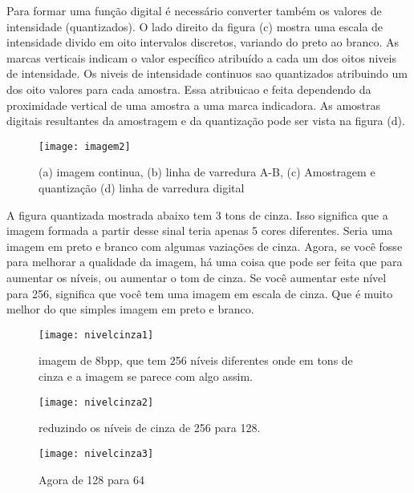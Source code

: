 \documentclass[a4paper,11pt]{article}
\begin{document}
\begin{multicols}{2}
Para formar uma função digital é necessário converter também os valores de intensidade (quantizados). O lado direito da figura (c) mostra uma escala de intensidade divido em oito intervalos discretos, variando do preto ao branco. As marcas verticais indicam o valor
específico atribuído a cada um dos oitos niveis de intensidade. Os niveis de intensidade
 continuos sao quantizados atribuindo um dos oito valores para cada amostra. Essa
 atribuicao e feita dependendo da proximidade vertical de uma amostra a uma marca
 indicadora. As amostras digitais resultantes da amostragem e da quantização pode ser
 vista na figura (d).

\begin{figure}[H]
	\centering 
	\texttt{[image: imagem2]}
	\caption{(a) imagem continua, (b) linha de varredura A-B, (c) Amostragem e quantização (d) linha de varredura digital}
	\label{fig:nonfloat}
\end{figure}


A figura quantizada mostrada abaixo tem 3 tons de cinza. Isso significa que a imagem formada a partir desse sinal teria apenas 5 cores diferentes. Seria uma imagem em preto e branco com algumas vaziações de cinza. Agora, se você fosse para melhorar a qualidade da imagem, há uma coisa que pode ser feita que para aumentar os níveis, ou aumentar o tom de cinza. Se você aumentar este nível para 256, significa que você tem uma imagem em escala de cinza. Que é muito melhor do que simples imagem em preto e branco.


\begin{figure}[H]
	\centering
	\texttt{[image: nivelcinza1]}
	\caption{imagem de 8bpp, que tem 256 níveis diferentes onde em tons de cinza e a imagem se parece com algo assim.}
	\label{fig:nonfloat}
\end{figure}

\begin{figure}[H]
	\centering
	\texttt{[image: nivelcinza2]}
	\caption{reduzindo os níveis de cinza de 256 para 128.}
	\label{fig:nonfloat}
\end{figure}

\begin{figure}[H]
	\centering
	\texttt{[image: nivelcinza3]}
	\caption{
		Agora de 128 para 64}
	\label{fig:nonfloat}
\end{figure}









\end{multicols}
\end{document}
